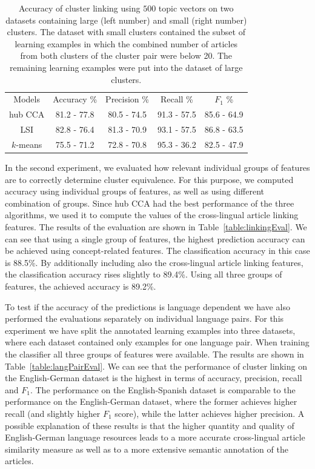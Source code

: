 \begin{table}[t]
\label{table:linkingEvalAlgosLargeSmall}
\begin{center}
\begin{tabular}{|c|c|c|c|c|}
  \hline
  \cline{1-5}
  Models & Accuracy \% & Precision \% & Recall \% & $F_1$ \% \\ \cline{1-5}
  hub CCA  & 81.2 - 77.8 & 80.5 - 74.5 & 91.3 - 57.5 & 85.6 - 64.9 \\ \cline{1-5}
  LSI      & 82.8 - 76.4 & 81.3 - 70.9 & 93.1 - 57.5 & 86.8 - 63.5 \\ \cline{1-5}
 $k$-means & 75.5 - 71.2 & 72.8 - 70.8 & 95.3 - 36.2 & 82.5 - 47.9 \\ \cline{1-5}
\end{tabular}
\end{center}
\caption{Accuracy of cluster linking using $500$ topic vectors on two datasets containing large (left number)
and small (right number) clusters. The dataset with small clusters contained the subset of
learning examples in which the combined number of articles from both clusters of the cluster
pair were below 20. The remaining learning examples were put into the dataset of large clusters.}
\end{table}

In the second experiment, we evaluated how relevant individual groups of features are 
to correctly determine cluster equivalence. For this purpose, we computed accuracy using 
individual groups of features, as well as using different combination of groups. 
Since hub CCA had the best performance of the three algorithms, we used it to compute 
the values of the cross-lingual article linking features. The results of the evaluation 
are shown in Table~\ref{table:linkingEval}. We can see that using a single group of features, 
the highest prediction accuracy can be achieved using concept-related features. 
The classification accuracy in this case is 88.5\%. By additionally including also the 
cross-lingual article linking features, the classification accuracy rises slightly 
to 89.4\%. Using all three groups of features, the achieved accuracy is 89.2\%.

To test if the accuracy of the predictions is language dependent we have also 
performed the evaluations separately on individual language pairs. For this 
experiment we have split the annotated learning examples into three datasets, 
where each dataset contained only examples for one language pair. When 
training the classifier all three groups of features were available. The 
results are shown in Table~\ref{table:langPairEval}. We can see that the 
performance of cluster linking on the English-German dataset is the highest 
in terms of accuracy, precision, recall and $F_1$. The performance on the 
English-Spanish dataset is comparable to the performance on the English-German 
dataset, where the former achieves higher recall (and slightly higher $F_1$ score), 
while the latter achieves higher precision. A possible explanation of these 
results is that the higher quantity and quality of English-German language 
resources leads to a more accurate cross-lingual article similarity measure 
as well as to a more extensive semantic annotation of the articles.

